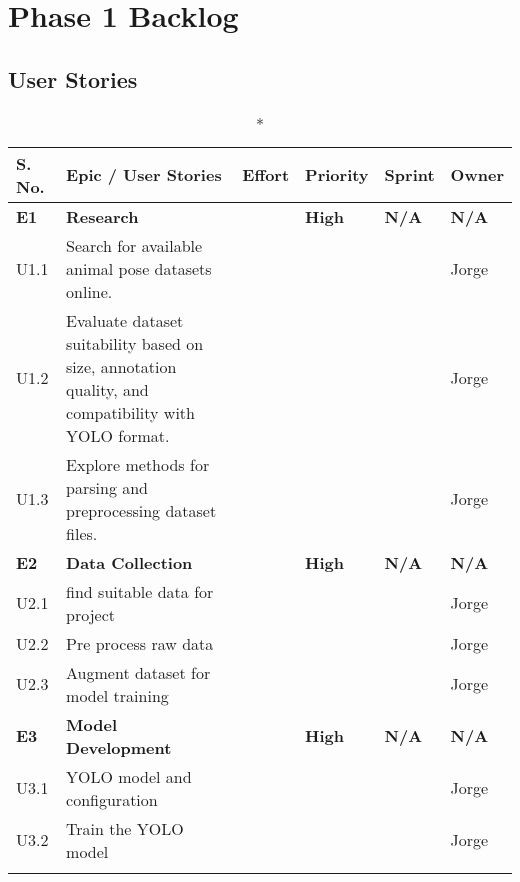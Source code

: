 \appendix
\chapter{Phase 1 Backlog}

\section{User Stories}
\begin{longtable}[h!]{|p{1cm}|p{8.6cm}|p{1cm}|p{1.2cm}|p{1.2cm}|p{1.3cm}|}
    \caption*{}
    \centering
    \hline
    \rowcolor{gray}S. No. & Epic / User Stories & Effort & Priority & Sprint & Owner \\ 
    \midrule
	\rowcolor{lightgray}\textbf{E1}   & \textbf{Research} & \textbf{} & \textbf{High} & \textbf{N/A} & \textbf{N/A}\\
    \hline
    U1.1 & Search for available animal pose datasets online. & &  &  & Jorge\\
    \hline
    U1.2  & Evaluate dataset suitability based on size, annotation quality, and compatibility with YOLO format. &  &  &  & Jorge\\
    \hline
    U1.3  & Explore methods for parsing and preprocessing dataset files.&  &  &  & Jorge\\
    \hline
    \midrule
    \rowcolor{lightgray}\textbf{E2}   & \textbf{Data Collection}   &  \textbf{}  & \textbf{High} & \textbf{N/A} & \textbf{N/A}   \\ 
    \hline
    U2.1 & find suitable data for project & & &&Jorge \\
    \hline
    U2.2 & Pre process raw data &  & & &Jorge \\
    \hline
    U2.3 & Augment dataset for model training &  & &  &Jorge \\
    \hline
   
    
	\midrule
	\rowcolor{lightgray}\textbf{E3}   & \textbf{Model Development} & \textbf{} & \textbf{High} & \textbf{N/A} & \textbf{N/A}\\
    \hline
    U3.1 & YOLO model and configuration &  &  & & Jorge\\
    \hline
    U3.2 & Train the YOLO model &  &  &  &Jorge \\   
    \midrule
 \newpage


\end{longtable}
